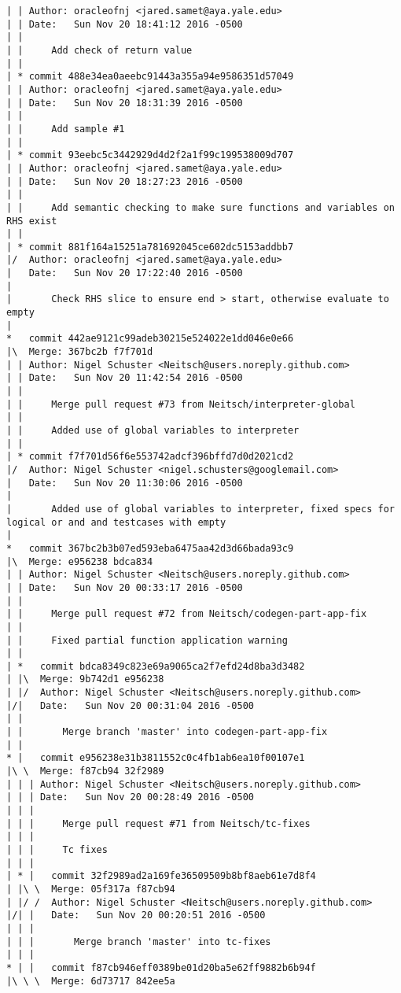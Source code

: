 \begin{lstlisting}
| | Author: oracleofnj <jared.samet@aya.yale.edu>
| | Date:   Sun Nov 20 18:41:12 2016 -0500
| | 
| |     Add check of return value
| |   
| * commit 488e34ea0aeebc91443a355a94e9586351d57049
| | Author: oracleofnj <jared.samet@aya.yale.edu>
| | Date:   Sun Nov 20 18:31:39 2016 -0500
| | 
| |     Add sample #1
| |   
| * commit 93eebc5c3442929d4d2f2a1f99c199538009d707
| | Author: oracleofnj <jared.samet@aya.yale.edu>
| | Date:   Sun Nov 20 18:27:23 2016 -0500
| | 
| |     Add semantic checking to make sure functions and variables on RHS exist
| |   
| * commit 881f164a15251a781692045ce602dc5153addbb7
|/  Author: oracleofnj <jared.samet@aya.yale.edu>
|   Date:   Sun Nov 20 17:22:40 2016 -0500
|   
|       Check RHS slice to ensure end > start, otherwise evaluate to empty
|    
*   commit 442ae9121c99adeb30215e524022e1dd046e0e66
|\  Merge: 367bc2b f7f701d
| | Author: Nigel Schuster <Neitsch@users.noreply.github.com>
| | Date:   Sun Nov 20 11:42:54 2016 -0500
| | 
| |     Merge pull request #73 from Neitsch/interpreter-global
| |     
| |     Added use of global variables to interpreter
| |   
| * commit f7f701d56f6e553742adcf396bffd7d0d2021cd2
|/  Author: Nigel Schuster <nigel.schusters@googlemail.com>
|   Date:   Sun Nov 20 11:30:06 2016 -0500
|   
|       Added use of global variables to interpreter, fixed specs for logical or and and testcases with empty
|    
*   commit 367bc2b3b07ed593eba6475aa42d3d66bada93c9
|\  Merge: e956238 bdca834
| | Author: Nigel Schuster <Neitsch@users.noreply.github.com>
| | Date:   Sun Nov 20 00:33:17 2016 -0500
| | 
| |     Merge pull request #72 from Neitsch/codegen-part-app-fix
| |     
| |     Fixed partial function application warning
| |     
| *   commit bdca8349c823e69a9065ca2f7efd24d8ba3d3482
| |\  Merge: 9b742d1 e956238
| |/  Author: Nigel Schuster <Neitsch@users.noreply.github.com>
|/|   Date:   Sun Nov 20 00:31:04 2016 -0500
| |   
| |       Merge branch 'master' into codegen-part-app-fix
| |     
* |   commit e956238e31b3811552c0c4fb1ab6ea10f00107e1
|\ \  Merge: f87cb94 32f2989
| | | Author: Nigel Schuster <Neitsch@users.noreply.github.com>
| | | Date:   Sun Nov 20 00:28:49 2016 -0500
| | | 
| | |     Merge pull request #71 from Neitsch/tc-fixes
| | |     
| | |     Tc fixes
| | |      
| * |   commit 32f2989ad2a169fe36509509b8bf8aeb61e7d8f4
| |\ \  Merge: 05f317a f87cb94
| |/ /  Author: Nigel Schuster <Neitsch@users.noreply.github.com>
|/| |   Date:   Sun Nov 20 00:20:51 2016 -0500
| | |   
| | |       Merge branch 'master' into tc-fixes
| | |      
* | |   commit f87cb946eff0389be01d20ba5e62ff9882b6b94f
|\ \ \  Merge: 6d73717 842ee5a

\end{lstlisting}
